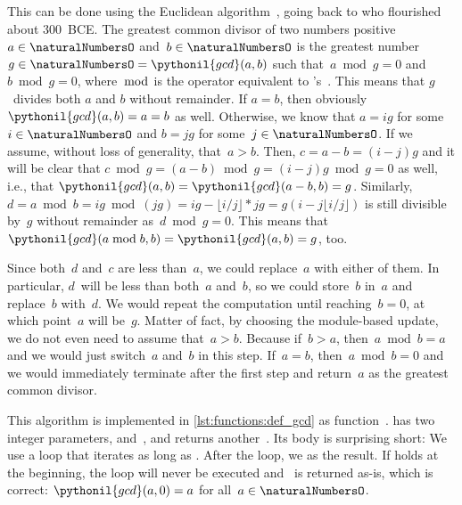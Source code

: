 This can be done using the Euclidean algorithm~\cite{EHF2008ENT,B1999FAOTBEA,TKY2016BEOEAOTCEG}, going back to \citeauthor{EHF2008ENT} who flourished about 300~BCE.
The greatest common divisor of two numbers positive~$a\in\naturalNumbersO$ and~$b\in\naturalNumbersO$ is the greatest number~$g\in\naturalNumbersO=\pythonil{gcd}(a,b)$ such that~$a\bmod g=0$ and~$b \bmod g=0$, where~$\bmod$ is the  operator equivalent to \python's~\pythonilIdx{\%}.
This means that $g$~divides both $a$ and $b$ without remainder.
If $a=b$, then obviously $\pythonil{gcd}(a,b)=a=b$ as well.
Otherwise, we know that $a=ig$ for some~$i\in\naturalNumbersO$ and $b=jg$ for some~$j\in\naturalNumbersO$.
If we assume, without loss of generality, that~$a>b$.
Then, $c=a-b=(i-j)g$ and it will be clear that $c\bmod g=(a-b)\bmod g=(i-j)g\bmod g = 0$ as well, i.e., that $\pythonil{gcd}(a,b)=\pythonil{gcd}(a-b, b)=g$.
Similarly, $d=a\bmod b=ig\bmod (jg)=ig-\lfloor i/j\rfloor*jg=g(i-j\lfloor i/j\rfloor)$ is still divisible by~$g$ without remainder as~$d\bmod g=0$.
This means that~$\pythonil{gcd}(a\bmod b, b)=\pythonil{gcd}(a, b)=g$, too.

Since both~$d$ and~$c$ are less than~$a$, we could replace~$a$ with either of them.
In particular, $d$~will be less than both~$a$ and~$b$, so we could store~$b$ in~$a$ and replace~$b$ with~$d$.
We would repeat the computation until reaching~$b=0$, at which point~$a$ will be~$g$.
Matter of fact, by choosing the module-based update, we do not even need to assume that~$a>b$.
Because if~$b>a$, then~$a \bmod b=a$ and we would just switch~$a$ and~$b$ in this step.
If~$a=b$, then~$a \bmod b=0$ and we would immediately terminate after the first step and return~$a$ as the greatest common divisor.

This algorithm is implemented in \cref{lst:functions:def_gcd} as function~.
 has two integer parameters,  and~, and returns another~.
Its body is surprising short:
We use a  loop that iterates as long as .
After the loop, we  as the result.
If  holds at the beginning, the loop will never be executed and~ is returned as-is, which is correct:
$\pythonil{gcd}(a, 0)=a$ for all~$a\in\naturalNumbersO$.

